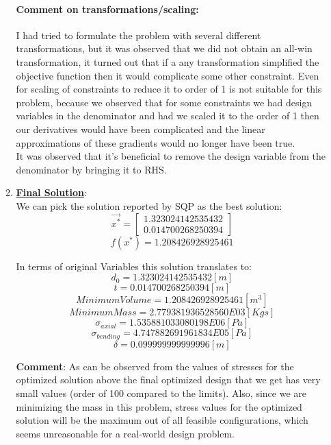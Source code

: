 \documentclass[12pt]{article}
\begin{document}
\begin{enumerate}[I]
\begin{enumerate}[1)]
\paragraph{Comment on transformations/scaling:} I had tried to formulate the problem with several different transformations, but it was observed that we did not obtain an all-win transformation, it turned out that if a any transformation simplified the objective function then it would complicate some other constraint. Even for scaling of constraints to reduce it to order of 1 is not suitable for this problem, because we observed that for some constraints we had design variables in the denominator and had we scaled it to the order of 1 then our derivatives would have been complicated and the linear approximations of these gradients would no longer have been true.\\

It was observed that it's beneficial to remove the design variable from the denominator by bringing it to RHS.\\

\item \textbf{\underline{Final Solution}}:\\
We can pick the solution reported by SQP as the best solution:\\
$$\vec{x^*}=\begin{bmatrix}1.323024142535432\\ 0.014700268250394 \end{bmatrix}$$
$$f(x^*)=1.208426928925461$$

In terms of original Variables this solution translates to:\\
$$d_0=1.323024142535432 [m]$$
$$t=0.014700268250394 [m]$$
$$Minimum Volume= 1.208426928925461 [m^3]$$
$$Minimum Mass= 2.779381936528560E03 [Kgs]$$
$$\sigma_{axial}= 1.535881033080198E06 [Pa] $$
$$\sigma_{bending}= 4.747882691961834E05 [Pa] $$
$$\delta=0.099999999999996 [m]$$

\textbf{Comment}: As can be observed from the values of stresses for the optimized solution above the final optimized design that we get has very small values (order of 100 compared to the limits). Also, since we are minimizing the mass in this problem, stress values for the optimized solution will be the maximum out of all feasible configurations, which seems unreasonable for a real-world design problem.

\end{enumerate}%
\end{enumerate}%
\end{document}
